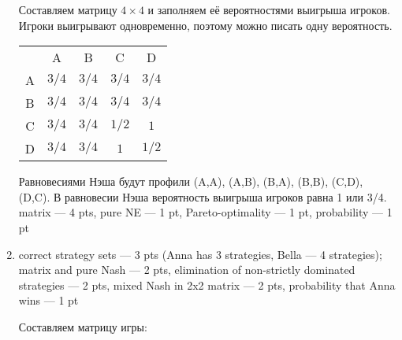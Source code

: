 \begin{enumerate}
Составляем матрицу $4\times 4$ и заполняем её вероятностями выигрыша игроков. Игроки выигрывают одновременно, поэтому можно писать одну вероятность.

\begin{tabular}{ccccc}
 & A & B & C & D \\
A & $3/4$ & $3/4$ & $3/4$ & $3/4$ \\
B & $3/4$ & $3/4$ & $3/4$ & $3/4$ \\
C & $3/4$ & $3/4$ & $1/2$ & $1$ \\
D & $3/4$ & $3/4$ & $1$ & $1/2$ \\
\end{tabular}


 Равновесиями Нэша будут профили (A,A), (A,B), (B,A), (B,B), (C,D), (D,C). В равновесии Нэша вероятность выигрыша игроков равна 1 или 3/4.
matrix --- 4 pts, pure NE --- 1 pt, Pareto-optimality --- 1 pt, probability --- 1 pt


\item correct strategy sets --- 3 pts (Anna has 3 strategies, Bella --- 4 strategies); matrix and pure Nash --- 2 pts, elimination of non-strictly dominated strategies --- 2 pts, mixed Nash in 2x2 matrix --- 2 pts, probability that Anna wins --- 1 pt

Составляем матрицу игры:


\end{enumerate}
